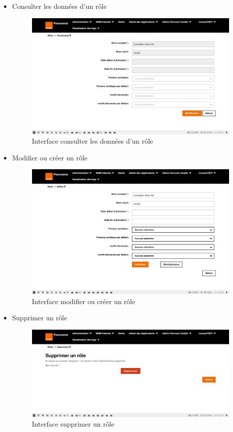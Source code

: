 \begin{itemize}
	\item Consulter les données d'un rôle
	\begin{figure}[H]
		\centering
		\includegraphics[width=0.6\linewidth]{img/screenshots/roles/view}
		\caption[Interface voir un rôle]{Interface consulter les données d'un rôle}
		\label{fig:view-role}
	\end{figure}
	\newpage
	\item Modifier ou créer un rôle
	\begin{figure}[H]
		\centering
		\includegraphics[width=0.7\linewidth]{img/screenshots/roles/edit}
		\caption[Interface modifier ou créer un rôle]{Interface modifier ou créer un rôle}
		\label{fig:modif-role}
	\end{figure}

	\item Supprimer un rôle
	\begin{figure}[H]
		\centering
		\includegraphics[width=0.7\linewidth]{img/screenshots/roles/delete}
		\caption[Interface sSupprimer un rôle]{Interface supprimer un rôle}
		\label{fig:delete-role}
	\end{figure}
\end{itemize}

